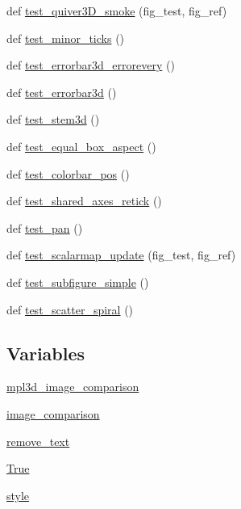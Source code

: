\begin{DoxyCompactItemize}
\item 
def \hyperlink{namespacetests_1_1test__mplot3d_ad5651a47cc4467fd64f521a63d7fcde4}{test\+\_\+quiver3\+D\+\_\+smoke} (fig\+\_\+test, fig\+\_\+ref)
\item 
def \hyperlink{namespacetests_1_1test__mplot3d_a0c9c61a599402c1d4db859f17ba2a43d}{test\+\_\+minor\+\_\+ticks} ()
\item 
def \hyperlink{namespacetests_1_1test__mplot3d_ae7a721e1e0a572fb2a25d6474576ad2e}{test\+\_\+errorbar3d\+\_\+errorevery} ()
\item 
def \hyperlink{namespacetests_1_1test__mplot3d_ae2edeea0042fd0caf57fd4aed880c5a3}{test\+\_\+errorbar3d} ()
\item 
def \hyperlink{namespacetests_1_1test__mplot3d_a6573f0917725fd7677c8222ec42af02e}{test\+\_\+stem3d} ()
\item 
def \hyperlink{namespacetests_1_1test__mplot3d_addb16866618f379ac5bd2ea16cf74857}{test\+\_\+equal\+\_\+box\+\_\+aspect} ()
\item 
def \hyperlink{namespacetests_1_1test__mplot3d_abe3ff1298a19bde5e8cb145d07f3ec80}{test\+\_\+colorbar\+\_\+pos} ()
\item 
def \hyperlink{namespacetests_1_1test__mplot3d_a876139aaaa5e448e48cc1ba2eb423ad9}{test\+\_\+shared\+\_\+axes\+\_\+retick} ()
\item 
def \hyperlink{namespacetests_1_1test__mplot3d_a342774ea5b79735fb7d69960f7687e49}{test\+\_\+pan} ()
\item 
def \hyperlink{namespacetests_1_1test__mplot3d_a429ba49ce0499c2f82f2177be0ec38a9}{test\+\_\+scalarmap\+\_\+update} (fig\+\_\+test, fig\+\_\+ref)
\item 
def \hyperlink{namespacetests_1_1test__mplot3d_a29e4db9f42d5dcc0f5a4b07f7ddc75ee}{test\+\_\+subfigure\+\_\+simple} ()
\item 
def \hyperlink{namespacetests_1_1test__mplot3d_ae0d987e2a137f3237e52576d158b9c5a}{test\+\_\+scatter\+\_\+spiral} ()
\end{DoxyCompactItemize}
\subsection*{Variables}
\begin{DoxyCompactItemize}
\item 
\hyperlink{namespacetests_1_1test__mplot3d_a1d84cc8b9512940a890a0c7573f5e2f9}{mpl3d\+\_\+image\+\_\+comparison}
\item 
\hyperlink{namespacetests_1_1test__mplot3d_a5ba3cbdba7b90fe5119309897e3bbb80}{image\+\_\+comparison}
\item 
\hyperlink{namespacetests_1_1test__mplot3d_a1a6bba28a9afba199a0ec37a140c174f}{remove\+\_\+text}
\item 
\hyperlink{namespacetests_1_1test__mplot3d_a3d400d1627076ea1a354f3b42eb0ab8d}{True}
\item 
\hyperlink{namespacetests_1_1test__mplot3d_acb95b984ffbe5e4184b11340975570b0}{style}
\end{DoxyCompactItemize}


